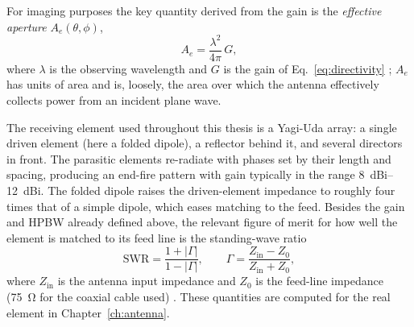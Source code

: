 For imaging purposes the key quantity derived from the gain is the
\emph{effective aperture} $A_e(\theta,\phi)$,
\begin{equation}
  A_e = \frac{\lambda^2}{4\pi}\,G ,
  \label{eq:aeff}
\end{equation}
where $\lambda$ is the observing wavelength and $G$ is the gain of
Eq.~\eqref{eq:directivity} \citep{balanis2016,tms2017}; $A_e$ has units of
area and is, loosely, the area over which the antenna effectively collects
power from an incident plane wave.

The receiving element used throughout this thesis is a Yagi-Uda array: a
single driven element (here a folded dipole), a reflector behind it, and
several directors in front. The parasitic elements re-radiate with phases set
by their length and spacing, producing an end-fire pattern with gain typically
in the range \SIrange{8}{12}{dBi}. The folded dipole raises the driven-element
impedance to roughly four times that of a simple dipole, which eases matching
to the feed. Besides the gain and HPBW already defined above, the relevant
figure of merit for how well the element is matched to its feed line is the
standing-wave ratio
\begin{equation}
  \mathrm{SWR} = \frac{1+|\Gamma|}{1-|\Gamma|},
  \qquad
  \Gamma = \frac{Z_\mathrm{in}-Z_0}{Z_\mathrm{in}+Z_0},
  \label{eq:swr}
\end{equation}
where $Z_\mathrm{in}$ is the antenna input impedance and $Z_0$ is the
feed-line impedance (\SI{75}{\ohm} for the coaxial cable used)
\citep{pozar2012,balanis2016}. These quantities are computed for the real
element in Chapter~\ref{ch:antenna}.

